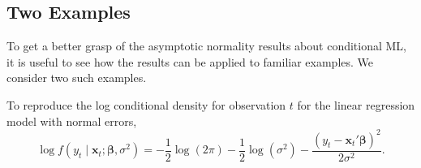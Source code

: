 \subsection*{Two Examples}

To get a better grasp of the asymptotic normality results about conditional ML, it is useful to see how the results can be applied to familiar examples. We consider two such examples.

\begin{example}
\label{ex:7.10}
To reproduce the log conditional density for observation $t$ for the linear regression model with normal errors,
\begin{equation}
\label{eq:7.3.16}
\log f(y_t \mid \mathbf{x}_t; \bm{\beta}, \sigma^2) = -\frac{1}{2}\log(2\pi) - \frac{1}{2}\log(\sigma^2) - \frac{(y_t - \mathbf{x}_t' \bm{\beta})^2}{2\sigma^2}.
\end{equation}


\end{example}
